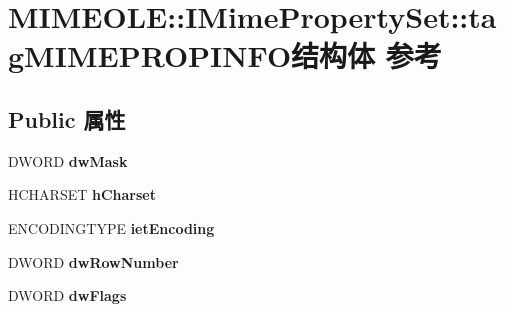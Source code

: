 \hypertarget{struct_m_i_m_e_o_l_e_1_1_i_mime_property_set_1_1tag_m_i_m_e_p_r_o_p_i_n_f_o}{}\section{M\+I\+M\+E\+O\+LE\+:\+:I\+Mime\+Property\+Set\+:\+:tag\+M\+I\+M\+E\+P\+R\+O\+P\+I\+N\+F\+O结构体 参考}
\label{struct_m_i_m_e_o_l_e_1_1_i_mime_property_set_1_1tag_m_i_m_e_p_r_o_p_i_n_f_o}
\subsection*{Public 属性}
\begin{DoxyCompactItemize}
\item 
\mbox{\label{struct_m_i_m_e_o_l_e_1_1_i_mime_property_set_1_1tag_m_i_m_e_p_r_o_p_i_n_f_o_ab33f1a26dc0c9478db104ab6c9a15684}} 
D\+W\+O\+RD {\bfseries dw\+Mask}
\item 
\mbox{\label{struct_m_i_m_e_o_l_e_1_1_i_mime_property_set_1_1tag_m_i_m_e_p_r_o_p_i_n_f_o_a3219bb836dad7560fadd5126fd74981a}} 
H\+C\+H\+A\+R\+S\+ET {\bfseries h\+Charset}
\item 
\mbox{\label{struct_m_i_m_e_o_l_e_1_1_i_mime_property_set_1_1tag_m_i_m_e_p_r_o_p_i_n_f_o_a2e401174d8c7f2c3cf3c4a9626297b69}} 
E\+N\+C\+O\+D\+I\+N\+G\+T\+Y\+PE {\bfseries iet\+Encoding}
\item 
\mbox{\label{struct_m_i_m_e_o_l_e_1_1_i_mime_property_set_1_1tag_m_i_m_e_p_r_o_p_i_n_f_o_a29e41b1bf3967df9a95ed4b49016f604}} 
D\+W\+O\+RD {\bfseries dw\+Row\+Number}
\item 
\mbox{\label{struct_m_i_m_e_o_l_e_1_1_i_mime_property_set_1_1tag_m_i_m_e_p_r_o_p_i_n_f_o_ab75c3a3041d8204d44e7685d79131c36}} 
D\+W\+O\+RD {\bfseries dw\+Flags}
\item 

\end{DoxyCompactItemize}
